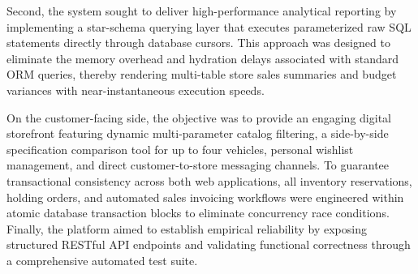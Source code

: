 Second, the system sought to deliver high-performance analytical reporting by implementing a star-schema querying layer that executes parameterized raw SQL statements directly through database cursors. This approach was designed to eliminate the memory overhead and hydration delays associated with standard ORM queries, thereby rendering multi-table store sales summaries and budget variances with near-instantaneous execution speeds.

On the customer-facing side, the objective was to provide an engaging digital storefront featuring dynamic multi-parameter catalog filtering, a side-by-side specification comparison tool for up to four vehicles, personal wishlist management, and direct customer-to-store messaging channels. To guarantee transactional consistency across both web applications, all inventory reservations, holding orders, and automated sales invoicing workflows were engineered within atomic database transaction blocks to eliminate concurrency race conditions. Finally, the platform aimed to establish empirical reliability by exposing structured RESTful API endpoints and validating functional correctness through a comprehensive automated test suite.




